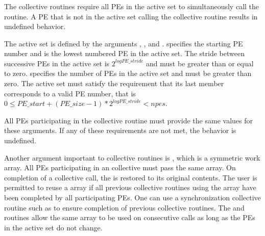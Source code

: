 \begin{DeprecateBlock}

\subsubsection*{}

The  collective routines require all \acp{PE}
in the active set to simultaneously call the
routine.  A \ac{PE} that is not in the active set calling the collective
routine results in undefined behavior.  

The active set is defined by the arguments , ,
and .   specifies the starting \ac{PE} number and
is the lowest numbered \ac{PE} in the active set.  The stride between successive
\acp{PE} in the active set is $2^{logPE\_stride}$ and  must
be greater than or equal to zero.   specifies the number of
\acp{PE} in the active set and must be greater than zero.  The active set must
satisfy the requirement that its last member corresponds to a valid \ac{PE}
number, that is
$0 \le PE\_start + (PE\_size - 1) * 2^{logPE\_stride} < npes$.

All \acp{PE} participating in the  collective routine must provide the same
values for these arguments.  If any of these requirements are not met, the
behavior is undefined.

Another argument important to  collective routines is , which is a
symmetric work array.  All \acp{PE} participating in an  collective must pass the
same  array.  On completion of  a collective call, the  is
restored to its original contents.  The user is permitted to reuse a 
array if all previous collective routines using the  array have been
completed by all participating \acp{PE}. One can use a synchronization
collective routine such as  to ensure completion of previous  collective
routines. The  and  routines allow the same
 array to be used on consecutive calls as long as the \acp{PE}
in the active set do not change.


\end{DeprecateBlock}
